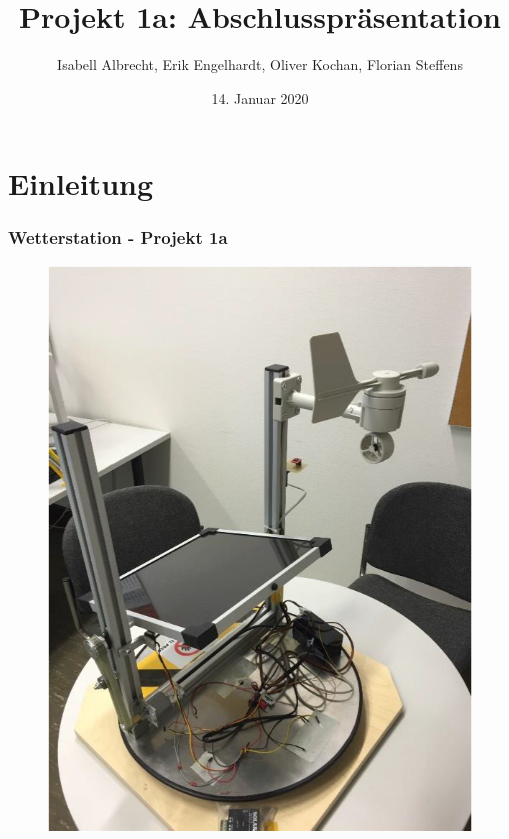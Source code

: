 \documentclass{beamer}
\title[]{Projekt 1a:
  Abschlusspräsentation} %
\author{Isabell Albrecht, Erik Engelhardt, Oliver Kochan, Florian
  Steffens} %
\institute[HAW] %
{ Hochschule für angewandte Wissenschaften -- Hamburg
  \\ %
  \medskip
}
\date{14. Januar 2020} %
\begin{document}
\begin{frame}
  \titlepage %
\end{frame}

\section{Einleitung}
\begin{frame}
  \frametitle{Wetterstation - Projekt 1a}
  \begin{figure}
    \centering
    \begin{minipage}[t]{0.45\linewidth}
      \centering
      \includegraphics[width=\linewidth]{img/Wetterstation_1.png}
    \end{minipage}%
    \hfill
    \begin{minipage}[t]{0.45\linewidth}
      \centering

\end{minipage}
\end{figure}
\end{frame}
\end{document}
